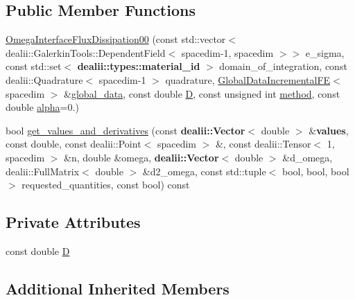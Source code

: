 \subsection*{Public Member Functions}
\begin{DoxyCompactItemize}
\item 
\hyperlink{classincremental_f_e_1_1_omega_interface_flux_dissipation00_a57559567b075fc91c5d43d6d1da03b1e}{Omega\+Interface\+Flux\+Dissipation00} (const std\+::vector$<$ dealii\+::\+Galerkin\+Tools\+::\+Dependent\+Field$<$ spacedim-\/1, spacedim $>$$>$ e\+\_\+sigma, const std\+::set$<$ {\bf dealii\+::types\+::material\+\_\+id} $>$ domain\+\_\+of\+\_\+integration, const dealii\+::\+Quadrature$<$ spacedim-\/1 $>$ quadrature, \hyperlink{classincremental_f_e_1_1_global_data_incremental_f_e}{Global\+Data\+Incremental\+FE}$<$ spacedim $>$ \&\hyperlink{classincremental_f_e_1_1_omega_abd23d288a7a4a43f9b528be968cd2113}{global\+\_\+data}, const double \hyperlink{classincremental_f_e_1_1_omega_interface_flux_dissipation00_ab6efbe2a1c165f99e02c22e4df530d0b}{D}, const unsigned int \hyperlink{classincremental_f_e_1_1_omega_a7600d263ebf98129629e44fa67e8a58c}{method}, const double \hyperlink{classincremental_f_e_1_1_omega_a891688560ec0ad8dc5a0058a7b400269}{alpha}=0.)
\item 
bool \hyperlink{classincremental_f_e_1_1_omega_interface_flux_dissipation00_a827b1a06021fa3853effb9e893488058}{get\+\_\+values\+\_\+and\+\_\+derivatives} (const {\bf dealii\+::\+Vector}$<$ double $>$ \&{\bf values}, const double, const dealii\+::\+Point$<$ spacedim $>$ \&, const dealii\+::\+Tensor$<$ 1, spacedim $>$ \&n, double \&omega, {\bf dealii\+::\+Vector}$<$ double $>$ \&d\+\_\+omega, dealii\+::\+Full\+Matrix$<$ double $>$ \&d2\+\_\+omega, const std\+::tuple$<$ bool, bool, bool $>$ requested\+\_\+quantities, const bool) const 
\end{DoxyCompactItemize}
\subsection*{Private Attributes}
\begin{DoxyCompactItemize}
\item 
const double \hyperlink{classincremental_f_e_1_1_omega_interface_flux_dissipation00_ab6efbe2a1c165f99e02c22e4df530d0b}{D}
\end{DoxyCompactItemize}
\subsection*{Additional Inherited Members}


